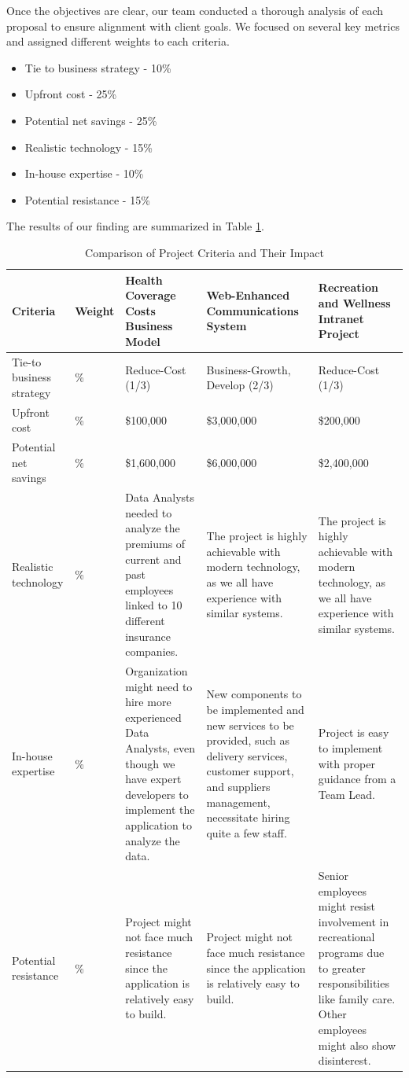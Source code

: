 Once the objectives are clear, our team conducted a thorough analysis of each proposal to ensure alignment with client goals. We focused on several key metrics and assigned different weights to each criteria.

\begin{itemize}
    \item Tie to business strategy - 10\%
    \item Upfront cost - 25\%
    \item Potential net savings - 25\%
    \item Realistic technology - 15\%
    \item In-house expertise - 10\%
    \item Potential resistance - 15\%
\end{itemize}
The results of our finding are summarized in Table \ref{tab:project_com}.

\begin{table}[h]
    \centering
    \caption{Comparison of Project Criteria and Their Impact}
    \label{tab:project_com}
    \begin{tabularx}{\textwidth}{>{\hsize=0.7\hsize}X>{\hsize=0.5\hsize}X>{\hsize=1.2\hsize}X>{\hsize=1.3\hsize}X>{\hsize=1.3\hsize}X}
    \toprule
    \textbf{Criteria} & \textbf{Weight} & \textbf{Health Coverage Costs Business Model} & \textbf{Web-Enhanced Communications System} & \textbf{Recreation and Wellness Intranet Project} \\
    \midrule
    Tie-to business strategy & 10\% & Reduce-Cost (1/3) & Business-Growth, Develop (2/3) & Reduce-Cost (1/3) \\
    Upfront cost & 25\% & \$100,000 & \$3,000,000 & \$200,000 \\
    Potential net savings & 25\% & \$1,600,000 & \$6,000,000 & \$2,400,000 \\
    Realistic technology & 15\% & Data Analysts needed to analyze the premiums of current and past employees linked to 10 different insurance companies. & The project is highly achievable with modern technology, as we all have experience with similar systems. & The project is highly achievable with modern technology, as we all have experience with similar systems. \\
    In-house expertise & 10\% & Organization might need to hire more experienced Data Analysts, even though we have expert developers to implement the application to analyze the data. & New components to be implemented and new services to be provided, such as delivery services, customer support, and suppliers management, necessitate hiring quite a few staff. & Project is easy to implement with proper guidance from a Team Lead. \\
    Potential resistance & 15\% & Project might not face much resistance since the application is relatively easy to build. & Project might not face much resistance since the application is relatively easy to build. & Senior employees might resist involvement in recreational programs due to greater responsibilities like family care. Other employees might also show disinterest. \\
    \bottomrule
    \end{tabularx}
\end{table}

